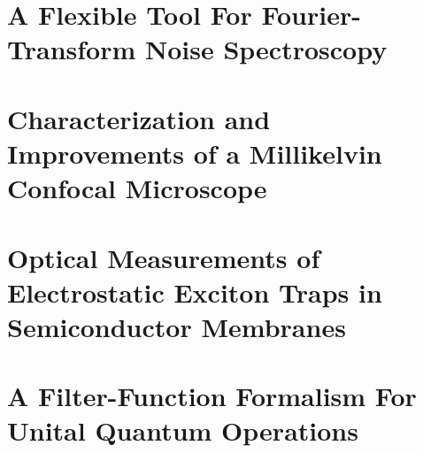 \documentclass[
    a4paper, %
    fontsize=10pt, %
    twoside=true, %
    numbers=noenddot, %
    fontmethod=modern, %
    listing=minted
]{kaobook}
\begin{document}
\part{A Flexible \python Tool For Fourier-Transform Noise Spectroscopy}
\label{part:speck}
\glsresetall %






\part{Characterization and Improvements of a Millikelvin Confocal Microscope}
\label{part:setup}
\glsresetall







\part{Optical Measurements of Electrostatic Exciton Traps in Semiconductor Membranes}
\label{part:exp}
\glsresetall







\part{A Filter-Function Formalism For Unital Quantum Operations}
\label{part:ff}
\glsresetall








\appendix %
\end{document}
